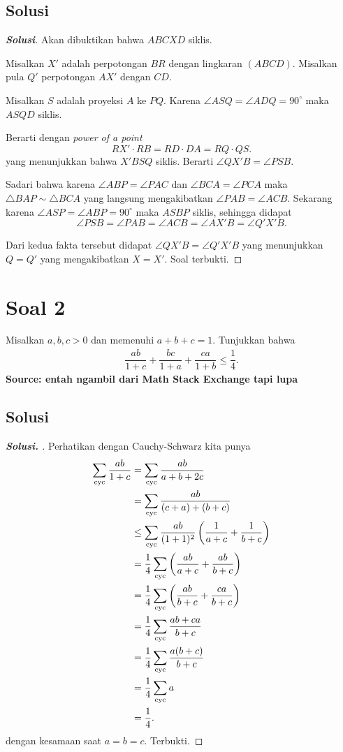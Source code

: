 \documentclass[12pt]{scrartcl}
\begin{document}
\subsection{Solusi}
\begin{proof}[\textbf{Solusi}]
Akan dibuktikan bahwa $ABCXD$ siklis. 

Misalkan $X'$ adalah perpotongan $BR$ dengan lingkaran $(ABCD)$. Misalkan pula $Q'$ perpotongan $AX'$ dengan $CD$.

Misalkan $S$ adalah proyeksi $A$ ke $PQ$. Karena $\angle ASQ = \angle ADQ = 90^\circ$ maka $ASQD$ siklis.

Berarti dengan \textit{power of a point}
$$RX'\cdot RB = RD\cdot DA = RQ\cdot QS.$$
yang menunjukkan bahwa $X'BSQ$ siklis. Berarti $\angle QX'B = \angle PSB$.

Sadari bahwa karena $\angle ABP = \angle PAC$ dan $\angle BCA = \angle PCA$ maka $\triangle BAP \sim \triangle BCA$ yang langsung mengakibatkan $\angle PAB = \angle ACB$.
Sekarang karena $\angle ASP = \angle ABP = 90^\circ$ maka $ASBP$ siklis, sehingga didapat $$\angle PSB = \angle PAB = \angle ACB = \angle AX'B = \angle Q'X'B.$$

Dari kedua fakta tersebut didapat $\angle QX'B = \angle Q'X'B$ yang menunjukkan $Q = Q'$ yang mengakibatkan $X = X'$. Soal terbukti.
\end{proof}

\newpage
\section{Soal 2} Misalkan $a,b,c > 0$ dan memenuhi $a+b+c=1$. Tunjukkan bahwa
\begin{align*}
\dfrac{ab}{1+c}+\dfrac{bc}{1+a}+\dfrac{ca}{1+b} \le \dfrac{1}{4}.
\end{align*}
\newline
\textbf{Source: entah ngambil dari Math Stack Exchange tapi lupa}
\subsection{Solusi}
\begin{proof}[\textbf{Solusi. }]
    Perhatikan dengan Cauchy-Schwarz kita punya
    \begin{align*}
        \sum_{\mathrm{cyc}} \dfrac{ab}{1+c} &= \sum_{\mathrm{cyc}} \dfrac{ab}{a+b+2c}\\
        &= \sum_{\mathrm{cyc}} \dfrac{ab}{(c+a)+(b+c)}\\
        &\le \sum_{\mathrm{cyc}} \dfrac{ab}{(1+1)^2}\left(\dfrac{1}{a+c} + \dfrac{1}{b+c}\right)\\
        &= \dfrac{1}{4} \sum_{\mathrm{cyc}} \left(\dfrac{ab}{a+c} + \dfrac{ab}{b+c}\right)\\
        &= \dfrac{1}{4}\sum_{\mathrm{cyc}} \left(\dfrac{ab}{b+c}+\dfrac{ca}{b+c}\right)\\
        &= \dfrac{1}{4}\sum_{\mathrm{cyc}} \dfrac{ab+ca}{b+c}\\
        &= \dfrac{1}{4}\sum_{\mathrm{cyc}} \dfrac{a(b+c)}{b+c}\\
        &= \dfrac{1}{4}\sum_{\mathrm{cyc}} a\\
        &= \dfrac{1}{4}.
    \end{align*}
    dengan kesamaan saat $a=b=c$. Terbukti.
\end{proof}
\end{document}
